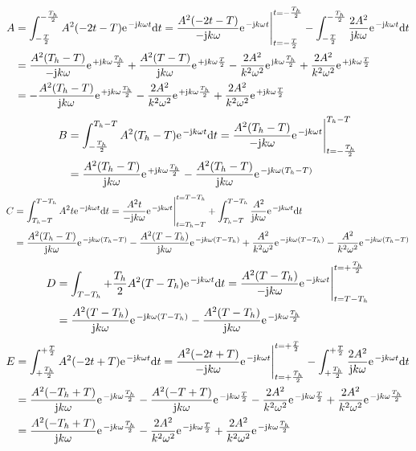 \documentclass[11pt,a4paper,DIV=12]{scrartcl}
\newcommand{\diff}{\mathrm{d}}
\begin{document}
\begin{align}
	A&=\int_{-\frac{T}{2}}^{-\frac{T_h}{2}}A^2(-2t-T)\e^{-\im k \omega t}\diff t=\frac{A^2(-2t-T)}{-\im k \omega}\e^{-\im k \omega t}\Bigg |_{t=-\frac{T}{2}}^{t=-\frac{T_h}{2}}-\int_{-\frac{T}{2}}^{-\frac{T_h}{2}}\frac{2A^2}{\im k \omega}\e^{-\im k \omega t}\diff t\nonumber \\
	&=\frac{A^2(T_h-T)}{-\im k \omega}\e^{+\im k \omega \frac{T_h}{2}}+\frac{A^2(T-T)}{\im k \omega}\e^{+\im k \omega \frac{T}{2}}-\frac{2A^2}{k^2\omega^2}\e^{\im k \omega \frac{T_h}{2}}+\frac{2A^2}{k^2\omega^2}\e^{+\im k \omega \frac{T}{2}}\nonumber \\
	&=-\frac{A^2(T_h-T)}{\im k \omega}\e^{+\im k \omega \frac{T_h}{2}}-\frac{2A^2}{k^2\omega^2}\e^{+\im k \omega \frac{T_h}{2}}+\frac{2A^2}{k^2\omega^2}\e^{+\im k \omega \frac{T}{2}}
\end{align}
\begin{align}
	B&=\int_{-\frac{T_h}{2}}^{T_h-T}A^2(T_h-T)\e^{-\im k \omega t}\diff t = \frac{A^2(T_h-T)}{-\im k \omega}\e^{-\im k \omega t}\Bigg |_{t=-\frac{T_h}{2}}^{T_h-T}\nonumber \\
	&=\frac{A^2(T_h-T)}{\im k \omega}\e^{+\im k \omega \frac{T_h}{2}}-\frac{A^2(T_h-T)}{\im k \omega}\e^{-\im k \omega (T_h-T)}
\end{align}
\begin{align}
	C&=\int_{T_h-T}^{T-T_h}A^2t\e^{-\im k \omega t}\diff t=\frac{A^2t}{-\im k \omega }\e^{-\im k \omega t}\Bigg |_{t=T_h-T}^{t=T-T_h}+\int_{T_h-T}^{T-T_h}\frac{A^2}{\im k \omega}\e^{-\im k \omega t}\diff t\nonumber \\
	&=\frac{A^2(T_h-T)}{\im k \omega}\e^{-\im k \omega (T_h-T)}-\frac{A^2(T-T_h)}{\im k \omega}\e^{-\im k \omega (T-T_h)}+\frac{A^2}{k^2\omega^2}\e^{-\im k \omega (T-T_h)}-\frac{A^2}{k^2\omega^2}\e^{-\im k \omega (T_h-T)}
\end{align}
\begin{align}
	D&=\int_{T-T_h}{+\frac{T_h}{2}}A^2(T-T_h)\e^{-\im k \omega t}\diff t=\frac{A^2(T-T_h)}{-\im k \omega}\e^{-\im k \omega t}\Bigg |_{t=T-T_h}^{t=+\frac{T_h}{2}}\nonumber \\
	&=\frac{A^2(T-T_h)}{\im k \omega}\e^{-\im k \omega(T-T_h)}-\frac{A^2(T-T_h)}{\im k \omega}\e^{-\im k \omega \frac{T_h}{2}}
\end{align}
\begin{align}
	E&=\int_{+\frac{T_h}{2}}^{+\frac{T}{2}}A^2(-2t+T)\e^{-\im k \omega t}\diff t=\frac{A^2(-2t+T)}{-\im k \omega }\e^{-\im k \omega t}\Bigg |_{t=+\frac{T_h}{2}}^{t=+\frac{T}{2}}-\int_{+\frac{T_h}{2}}^{+\frac{T}{2}}\frac{2A^2}{\im k \omega}\e^{-\im k \omega t}\diff t\nonumber \\
	&=\frac{A^2(-T_h+T)}{\im k \omega}\e^{-\im k \omega \frac{T_h}{2}}-\frac{A^2(-T+T)}{\im k \omega}\e^{-\im k \omega \frac{T}{2}}-\frac{2A^2}{k^2\omega^2}\e^{-\im k \omega \frac{T}{2}}+\frac{2A^2}{k^2\omega^2}\e^{-\im k \omega \frac{T_h}{2}}\nonumber \\
	&=\frac{A^2(-T_h+T)}{\im k \omega}\e^{-\im k\omega \frac{T_h}{2}}-\frac{2A^2}{k^2\omega^2}\e^{-\im k \omega \frac{T}{2}}+\frac{2A^2}{k^2\omega^2}\e^{-\im k \omega \frac{T_h}{2}}
\end{align}
\end{document}
